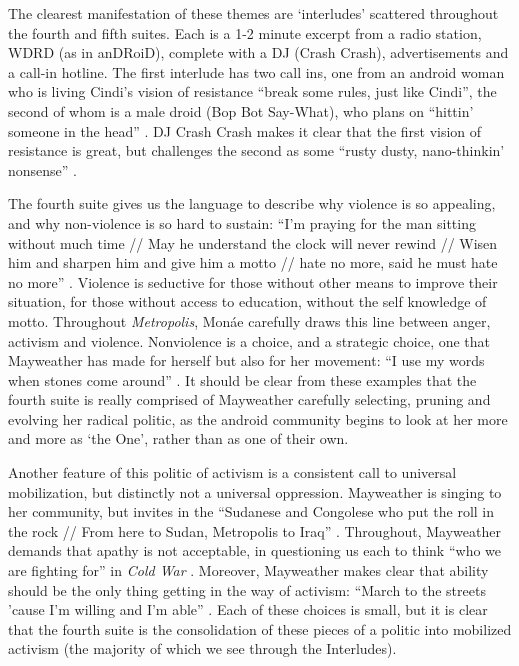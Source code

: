 \documentclass[a4paper, 11pt]{article} %
\begin{document}
The clearest manifestation of these themes are `interludes' scattered throughout the fourth and fifth suites.
Each is a 1-2 minute excerpt from a radio station, WDRD (as in anDRoiD), complete with a DJ (Crash Crash), advertisements and a call-in hotline.
The first interlude has two call ins, one from an android woman who is living Cindi's vision of resistance ``break some rules, just like Cindi'', the second of whom is a male droid (Bop Bot Say-What), who plans on ``hittin' someone in the head'' \cite{goodmorningmidnight}.
DJ Crash Crash makes it clear that the first vision of resistance is great, but challenges the second as some ``rusty dusty, nano-thinkin' nonsense'' \cite{goodmorningmidnight}.

The fourth suite gives us the language to describe why violence is so appealing, and why non-violence is so hard to sustain:
``I'm praying for the man sitting without much time // May he understand the clock will never rewind // Wisen him and sharpen him and give him a motto // hate no more, said he must hate no more'' \cite{danceordie}.
Violence is seductive for those without other means to improve their situation, for those without access to education, without the self knowledge of motto.
Throughout \emph{Metropolis}, Mon\'ae carefully draws this line between anger, activism and violence.
Nonviolence is a choice, and a strategic choice, one that Mayweather has made for herself  but also for her movement: ``I use my words when stones come around'' \cite{manymoons}.
It should be clear from these examples that the fourth suite is really comprised of Mayweather carefully selecting, pruning and evolving her radical politic, as the android community begins to look at her more and more as `the One', rather than as one of their own.

Another feature of this politic of activism is a consistent call to universal mobilization, but distinctly not a universal oppression.
Mayweather is singing to her community, but invites in the 
``Sudanese and Congolese who put the roll in the rock // From here to Sudan, Metropolis to Iraq'' \cite{danceordie}.
Throughout, Mayweather demands that apathy is not acceptable, in questioning us each to think ``who we are fighting for'' in \emph{Cold War} \cite{coldwar}.
Moreover, Mayweather makes clear that ability should be the only thing getting in the way of activism: 
``March to the streets 'cause I'm willing and I'm able'' \cite{queen}.
Each of these choices is small, but it is clear that the fourth suite is the consolidation of these pieces of a politic into mobilized activism (the majority of which we see through the Interludes).
\end{document}
